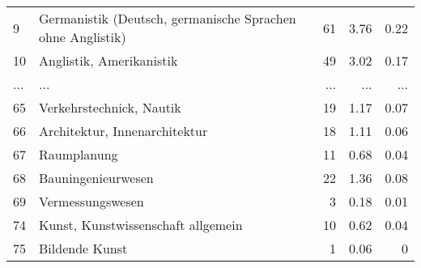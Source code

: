 \begin{longtable}{lXrrr}
        9 & \multicolumn{1}{X}{Germanistik (Deutsch, germanische Sprachen ohne Anglistik)} & %
          \num{61} &
          \num[round-mode=places,round-precision=2]{3.76} &
          \num[round-mode=places,round-precision=2]{0.22} \\
        10 & \multicolumn{1}{X}{Anglistik, Amerikanistik} & %
          \num{49} &
          \num[round-mode=places,round-precision=2]{3.02} &
          \num[round-mode=places,round-precision=2]{0.17} \\
       ... & ... & ... & ... & ... \\
        65 & \multicolumn{1}{X}{Verkehrstechnick, Nautik} & %
          \num{19} &
          \num[round-mode=places,round-precision=2]{1.17} &
          \num[round-mode=places,round-precision=2]{0.07} \\

        66 & \multicolumn{1}{X}{Architektur, Innenarchitektur} & %
          \num{18} &
          \num[round-mode=places,round-precision=2]{1.11} &
          \num[round-mode=places,round-precision=2]{0.06} \\

        67 & \multicolumn{1}{X}{Raumplanung} & %
          \num{11} &
          \num[round-mode=places,round-precision=2]{0.68} &
          \num[round-mode=places,round-precision=2]{0.04} \\

        68 & \multicolumn{1}{X}{Bauningenieurwesen} & %
          \num{22} &
          \num[round-mode=places,round-precision=2]{1.36} &
          \num[round-mode=places,round-precision=2]{0.08} \\

        69 & \multicolumn{1}{X}{Vermessungswesen} & %
          \num{3} &
          \num[round-mode=places,round-precision=2]{0.18} &
          \num[round-mode=places,round-precision=2]{0.01} \\

        74 & \multicolumn{1}{X}{Kunst, Kunstwissenschaft allgemein} & %
          \num{10} &
          \num[round-mode=places,round-precision=2]{0.62} &
          \num[round-mode=places,round-precision=2]{0.04} \\

        75 & \multicolumn{1}{X}{Bildende Kunst} & %
          \num{1} &
          \num[round-mode=places,round-precision=2]{0.06} &
          \num[round-mode=places,round-precision=2]{0} \\


\end{longtable}
